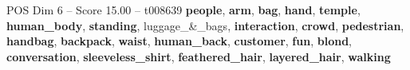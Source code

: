 \begin{textsample}{POS Dim 6 – Score 15.00 – t008639}  \label{ex:f6_pos_027}
\textbf{people}, \textbf{arm}, \textbf{bag}, \textbf{hand}, \textbf{temple}, \textbf{human\_body}, \textbf{standing}, luggage\_\&\_bags, \textbf{interaction}, \textbf{crowd}, \textbf{pedestrian}, \textbf{handbag}, \textbf{backpack}, \textbf{waist}, \textbf{human\_back}, \textbf{customer}, \textbf{fun}, \textbf{blond}, \textbf{conversation}, \textbf{sleeveless\_shirt}, \textbf{feathered\_hair}, \textbf{layered\_hair}, \textbf{walking}

\end{textsample}
